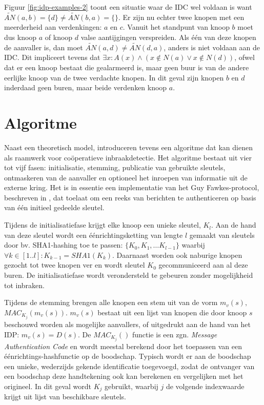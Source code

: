 Figuur \ref{fig:idp-examples-2} toont een situatie waar de IDC wel voldaan is
want $\tilde{AN}(a,b) = \{d\} \not= \tilde{AN}(b,a) = \{\}$. Er zijn nu echter
twee knopen met een meerderheid aan verdenkingen: $a$ en $c$. Vanuit het
standpunt van knoop $b$ moet dus knoop $a$ of knoop $d$ valse aantijgingen
verspreiden. Als \'e\'en van deze knopen de aanvaller is, dan moet
$\tilde{AN}(a,d) \not= \tilde{AN}(d,a)$, anders is niet voldaan aan de IDC. Dit
impliceert tevens dat $\exists x : A(x) \wedge ( x \not\in N(a) \vee x \not\in
N(d) )$, ofwel dat er een knoop bestaat die gealarmeerd is, maar geen buur is
van de andere eerlijke knoop van de twee verdachte knopen. In dit geval zijn
knopen $b$ en $d$ inderdaad geen buren, maar beide verdenken knoop $a$.

\section{Algoritme}
\label{section:cooperation-algorithm}

Naast een theoretisch model, introduceren \citep{krontiris2009cooperative}
tevens een algoritme dat kan dienen als raamwerk voor co\"operatieve
inbraakdetectie. Het algoritme bestaat uit vier tot vijf fasen: initialisatie,
stemming, publicatie van gebruikte sleutels, ontmaskeren van de aanvaller en
optioneel het inroepen van informatie uit de externe kring. Het is in essentie
een implementatie van het Guy Fawkes-protocol, beschreven in
\citep{anderson1998new}, dat toelaat om een reeks van berichten te authenticeren
op basis van \'e\'en initieel gedeelde sleutel.

Tijdens de initialisatiefase krijgt elke knoop een unieke sleutel, $K_l$. Aan
de hand van deze sleutel wordt een \'e\'enrichtingsketting van lengte $l$
gemaakt van sleutels door bv. SHA1-hashing \citep{rfc:3174} toe te passen:
$\{K_0, K_1,\dots K_{l-1}\}$ waarbij $\forall k \in [1..l] : K_{k-1} =
SHA1(K_k)$. Daarnaast worden ook naburige knopen gezocht tot twee knopen ver en
wordt sleutel $K_0$ gecommuniceerd aan al deze buren. De initialisatiefase
wordt verondersteld te gebeuren zonder mogelijkheid tot inbraken.

Tijdens de stemming brengen alle knopen een stem uit van de vorm $m_v(s),$ $
MAC_{K_j}(m_v(s))$. $m_v(s)$ bestaat uit een lijst van knopen die door knoop
$s$ beschouwd worden als mogelijke aanvallers, of uitgedrukt aan de hand van
het IDP: $m_v(s) = D(s)$. De $MAC_{K_j}()$ functie is een zgn. \emph{Message
Authentication Code} \citep{rfc:2104} en wordt meestal berekend door het
toepassen van een \'e\'enrichtings-hashfunctie op de boodschap. Typisch wordt
er aan de boodschap een unieke, wederzijds gekende identificatie toegevoegd,
zodat de ontvanger van een boodschap deze handtekening ook kan berekenen en
vergelijken met het origineel. In dit geval wordt $K_j$ gebruikt, waarbij $j$
de volgende indexwaarde krijgt uit lijst van beschikbare sleutels.

